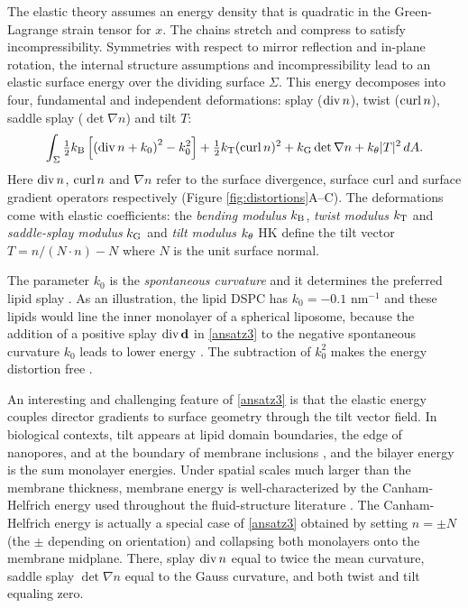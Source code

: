 The elastic theory assumes an energy density that is quadratic in the Green-Lagrange strain tensor for $x$. 
The chains stretch and compress to satisfy incompressibility.
Symmetries with respect to mirror reflection and in-plane rotation, the internal structure assumptions and incompressibility
lead to an elastic surface energy over the dividing surface $\Sigma$. 
This energy decomposes into four, fundamental and independent deformations:
splay ($\operatorname{div} n$), twist ($\operatorname{curl} n$), saddle splay ($\det \nabla n$) and tilt $T$:
\begin{equation}
\label{ansatz3}
\begin{aligned}
\int_{\Sigma} 
  \tfrac{1}{2}k_{\mathrm{B}}\left[ \left( \operatorname{div} n + k_0\right)^2 - k_0^2\right] 
+ \tfrac{1}{2}k_{\mathrm{T}} (\operatorname{curl} n)^2 + k_{\mathrm{G}}  \det \nabla n + k_{\theta} |T|^2 \,dA.
\end{aligned}
\end{equation}
Here $\operatorname{div} n$, $\operatorname{curl} n$ and $\nabla n$ refer to the surface divergence, surface curl and surface gradient operators
respectively (Figure \ref{fig:distortions}A--C).
The deformations come with elastic coefficients: the \emph{bending modulus} $k_{\mathrm{B}}$, \emph{twist modulus} $k_{\mathrm{T}}$ 
and \emph{saddle-splay modulus} $k_{\mathrm{G}}$ and \emph{tilt modulus} $k_{\theta}$
HK define the tilt vector $T = n/(N\cdot n) - N$ where $N$ is the unit surface normal.

The parameter $k_0$ is the \emph{spontaneous curvature} and it determines the preferred lipid splay \cite{RoLi15,Kozlov2007}. 
As an illustration, the lipid DSPC has $k_0 = -0.1$ nm$^{-1}$ 
and these lipids would line the  inner monolayer of a 
spherical liposome, because the addition of a positive splay $\operatorname{div} \mathbf{d}$  in \eqref{ansatz3}
to the negative spontaneous curvature $k_0$ leads to lower energy \cite{Kamal22245, C3SM51829A, RoLi15,FriedSeguin15}.
The subtraction of $k_0^2$ makes the energy distortion free
\cite{Helfrich73,PhysRevLett.113.248102,Hamm2000}.

An interesting and challenging feature of \eqref{ansatz3} is that
the elastic energy couples director gradients to surface geometry through the tilt vector field.
In biological contexts, tilt appears at lipid domain boundaries, the edge of nanopores, and at the boundary of membrane inclusions \cite{https://doi.org/10.1103/PhysRevE.102.042406}, and the bilayer energy is the sum monolayer energies. 
Under spatial scales much larger than the membrane thickness, membrane energy is well-characterized by
the Canham-Helfrich energy used throughout the fluid-structure literature \cite{}.
The Canham-Helfrich energy is actually a special case of \eqref{ansatz3} obtained by setting $n =  \pm N$ (the $\pm$ depending
on orientation) and collapsing both monolayers onto the membrane midplane. There,
splay $\operatorname{div} n$ equal to twice the mean curvature, saddle splay $\det \nabla n$ equal to the Gauss curvature,
and both twist and tilt equaling zero. 

